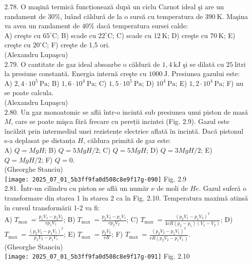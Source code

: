2.78. O maşinã termică funcționează după un ciclu Carnot ideal şi are un randament de $30 \%$, luând căldură de la o sursă cu temperatura de $390 \mathrm{~K}$. Maşina va avea un randament de $40 \%$ dacă temperatura sursei calde:\\ A) creşte cu $65^{\circ} \mathrm{C}$; B) scade cu $22^{\circ} \mathrm{C}$; C) scade cu $12 \mathrm{~K}$; D) creşte cu $70 \mathrm{~K}$; E) creşte cu $20^{\circ} \mathrm{C}$; F) creşte de 1,5 ori.\\ (Alexandru Lupaşcu)\\

2.79. O cantitate de gaz ideal absoarbe o căldură de $1,4 \mathrm{~kJ}$ şi se dilată cu $25 \mathrm{~litri}$ la presiune constantă. Energia internă creşte cu $1000 \mathrm{~J}$. Presiunea gazului este:\\ A) $2,4 \cdot 10^{5} \mathrm{~Pa}$; B) $1,6 \cdot 10^{4} \mathrm{~Pa}$; C) $1,5 \cdot 10^{5} \mathrm{~Pa}$; D) $10^{4} \mathrm{~Pa}$; E) $1,2 \cdot 10^{4} \mathrm{~Pa}$; F) nu se poate calcula.\\ (Alexandru Lupaşcu)\\

2.80. Un gaz monoatomic se află într-o incintă sub presiunea unui piston de masă $M$, care se poate mişca fără frecare cu pereții incintei (Fig. 2.9). Gazul este încălzit prin intermediul unei rezistențe electrice aflată în incintă. Dacã pistonul s-a deplasat pe distanța $H$, căldura primită de gaz este:\\ A) $Q=M g H$; B) $Q=5 M g H / 2$; C) $Q=5 M g H$; D) $Q=3 M g H / 2$; E) $Q=M g H / 2$; F) $Q=0$.\\ (Gheorghe Stanciu)\\ \texttt{[image: 2025\_07\_01\_5b3ff9fa0d508c8e9f17g-090]} Fig. 2.9\\

2.81. Într-un cilindru cu piston se află un număr $\nu$ de moli de $He$. Gazul suferă o transformare din starea 1 în starea 2 ca în Fig. 2.10. Temperatura maximă atinsă în cursul transformării 1-2 va fi:\\ A) $T_{\text {max }}=\frac{p_{1} V_{1}-p_{2} V_{2}}{v p_{1} V_{1}}$; B) $T_{\text {max }}=\frac{p_{2} V_{2}-p_{1} V_{1}}{v p_{2} V_{2}}$; C) $T_{\text {max }}=\frac{\left(p_{2} V_{1}-p_{1} V_{2}\right)^{2}}{4 v R\left(p_{2}-p_{1}\right)\left(V_{1}-V_{2}\right)}$; D) $T_{\text {max }}=\frac{\left(p_{2} V_{2}-p_{1} V_{1}\right)^{2}}{p_{2} V_{2}-p_{1} V_{1}}$; E) $T_{\text {max }}=\frac{p_{2} V_{2}}{v R}$; F) $T_{\text {max }}=\frac{\left(p_{2} V_{2}-p_{1} V_{1}\right)^{2}}{v R\left(p_{2} V_{2}-p_{1} V_{1}\right)}$.\\ (Gheorghe Stanciu)\\ \texttt{[image: 2025\_07\_01\_5b3ff9fa0d508c8e9f17g-091]} Fig. 2.10\\

